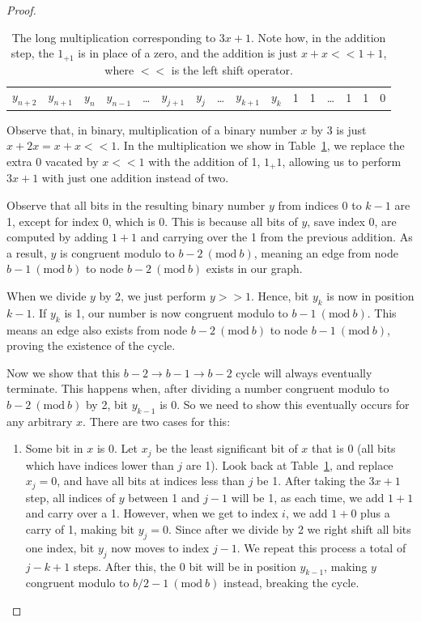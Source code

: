 \documentclass[12pt]{article}
\newcommand{\Mod}[1]{\ (\mathrm{mod}\ #1)}
\theoremstyle{definition}
\begin{document}
\begin{proof}
\begin{table}
\begin{tabular}{*{16}c}
  \hline
  $ y_{n+2}$  & $ y_{n+1}$  & $ y_{n}$  & $ y_{n-1}$  & \ldots & $ y_{j+1}$  & $ y_{j}$  & \ldots & $ y_{k+1}$  & $ y_{k}$  & 1 & 1 & \ldots & 1 & 1 & 0 
\end{tabular}
\caption{The long multiplication corresponding to $3x + 1$. Note how, in the addition step, the $1_{+1}$ is in place of a zero, and the addition is just $x + x << 1 + 1$, where $<<$ is the left shift operator.}
\label{tab:mul}
\end{table}
Observe that, in binary, multiplication of a binary number $x$ by 3 is just $x + 2x = x + x << 1$. In the multiplication we show in Table~\ref{tab:mul}, we replace the extra 0 vacated by $x << 1$ with the addition of 1, $1_+1$, allowing us to perform $3x+1$ with just one addition instead of two. \par
Observe that all bits in the resulting binary number $y$ from indices 0 to $k-1$ are 1, except for index 0, which is 0. This is because all bits of $y$, save index 0, are computed by adding $1+1$ and carrying over the 1 from the previous addition. As a result, $y$ is congruent modulo to $b-2 \Mod{b}$, meaning an edge from node $b-1 \Mod{b}$ to node $b-2 \Mod{b}$ exists in our graph.\par
When we divide $y$ by 2, we just perform $y >> 1$. Hence, bit $y_k$ is now in position $k-1$. If $y_k$ is 1, our number is now congruent modulo to $b-1 \Mod{b}$. This means an edge also exists from node $b-2 \Mod{b}$ to node $b-1 \Mod{b}$, proving the existence of the cycle. \par
Now we show that this $b-2 \rightarrow b-1 \rightarrow b-2$ cycle will always eventually terminate. This happens when, after dividing a number congruent modulo to $b-2 \Mod{b}$ by 2, bit $y_{k-1}$ is 0. So we need to show this eventually occurs for any arbitrary $x$. There are two cases for this:
\begin{enumerate}
    \item Some bit in $x$ is 0. Let $x_j$ be the least significant bit of $x$ that is 0 (all bits which have indices lower than $j$ are 1). Look back at Table~\ref{tab:mul}, and replace $x_j = 0$, and have all bits at indices less than $j$ be 1. After taking the $3x+1$ step, all indices of $y$ between 1 and $j-1$ will be 1, as each time, we add $1 + 1$ and carry over a 1. However, when we get to index $i$, we add $1 + 0$ plus a carry of 1, making bit $y_j = 0$. Since after we divide by 2 we right shift all bits one index, bit $y_j$ now moves to index $j-1$. We repeat this process a total of $j-k+1$ steps. After this, the 0 bit will be in position $y_{k-1}$, making $y$ congruent modulo to $b/2 - 1 \Mod{b}$ instead, breaking the cycle.

\end{enumerate}
\end{proof}
\end{document}
